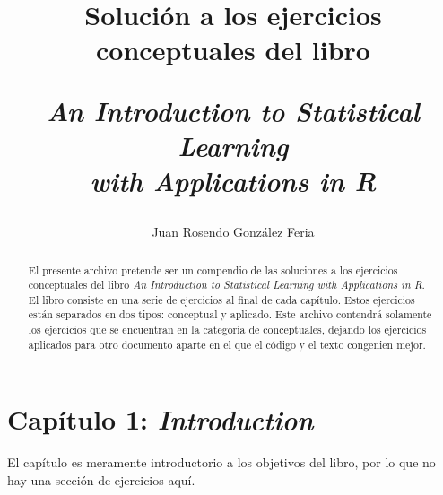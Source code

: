 \documentclass[a4paper,11pt]{article}
\title{Solución a los ejercicios conceptuales del libro
    \begin{center}
        \textit{An Introduction to Statistical Learning\\
        with Applications in R}
    \end{center}
    }
\author{Juan Rosendo González Feria}
\begin{document}
\maketitle

\begin{abstract}
    El presente archivo pretende ser un compendio de las soluciones a los
    ejercicios conceptuales del libro \textit{An Introduction to Statistical
    Learning with Applications in R}. El libro consiste en una serie de
    ejercicios al final de cada capítulo. Estos ejercicios están separados en
    dos tipos: conceptual y aplicado. Este archivo contendrá solamente los
    ejercicios que se encuentran en la categoría de conceptuales, dejando los
    ejercicios aplicados para otro documento aparte en el que el código y el
    texto congenien mejor.
\end{abstract}

\section{Capítulo 1: \textit{Introduction}}
    El capítulo es meramente introductorio a los objetivos del libro, por lo que
    no hay una sección de ejercicios aquí.
\end{document}
